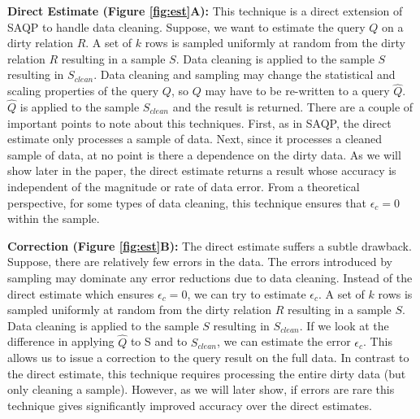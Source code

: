 \vspace{0.5em}
\noindent\textbf{Direct Estimate (Figure \ref{fig:est}A): } This technique is a direct extension of SAQP to handle data cleaning. Suppose, we want to estimate the query $Q$ on a dirty relation $R$. A set of $k$ rows is sampled uniformly at random from the dirty relation $R$ resulting in a sample $S$. Data cleaning is applied to the sample $S$ resulting in $S_{clean}$.
Data cleaning and sampling may change the statistical and scaling properties of the query $Q$, so $Q$ may have to be re-written to a query $\widehat{Q}$. $\widehat{Q}$ is applied to the sample $S_{clean}$ and the result is returned. 
There are a couple of important points to note about this techniques.
First, as in SAQP, the direct estimate only processes a sample of data.
Next, since it processes a cleaned sample of data, at no point is there a dependence on the dirty data.
As we will show later in the paper, the direct estimate returns a result whose accuracy is independent of the magnitude or rate of data error. 
From a theoretical perspective, for some types of data cleaning, this technique ensures that $\epsilon_c = 0$ within the sample.

\vspace{0.5em}
\noindent\textbf{Correction (Figure \ref{fig:est}B): } The direct estimate suffers a subtle drawback. Suppose, there are relatively few errors in the data. The errors introduced by sampling may dominate any error reductions due to data cleaning. Instead of the direct estimate which ensures $\epsilon_c = 0$, we can try to estimate $\epsilon_c$. A set of $k$ rows is sampled uniformly at random from the dirty relation $R$ resulting in a sample $S$. Data cleaning is applied to the sample $S$ resulting in $S_{clean}$. 
If we look at the difference in applying $\widehat{Q}$ to S and to $S_{clean}$, we can estimate the error $\epsilon_c$. 
This allows us to issue a correction to the query result on the full data.
In contrast to the direct estimate, this technique requires processing the entire dirty data (but only cleaning a sample).
However, as we will later show, if errors are rare this technique gives significantly improved accuracy over the direct estimates.

